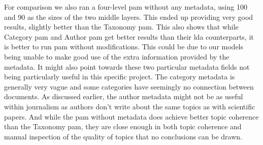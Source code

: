 For comparison we also ran a four-level \gls{pam} without any metadata, using 100 and 90 as the sizes of the two middle layers.
This ended up providing very good results, slightly better than the Taxonomy \gls{pam}.
This also shows that while Category \gls{pam} and Author \gls{pam} get better results than their \gls{lda} counterparts, it is better to run \gls{pam} without modifications.
This could be due to our models being unable to make good use of the extra information provided by the metadata.
It might also point towards these two particular metadata fields not being particularly useful in this specific project.
The category metadata is generally very vague and some categories have seemingly no connection between documents.
As discussed earlier, the author metadata might not be as useful within journalism as authors don't write about the same topics as with scientific papers.
And while the \gls{pam} without metadata does achieve better topic coherence than the Taxonomy \gls{pam}, they are close enough in both topic coherence and manual inspection of the quality of topics that no conclusions can be drawn.
